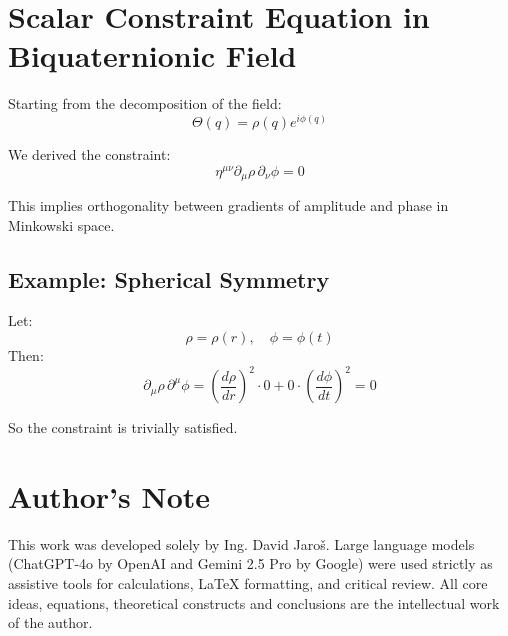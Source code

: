 \documentclass{article}
\begin{document}
\section*{Scalar Constraint Equation in Biquaternionic Field}

Starting from the decomposition of the field:
\[
\Theta(q) = \rho(q) e^{i\phi(q)}
\]

We derived the constraint:
\[
\eta^{\mu\nu} \partial_\mu \rho \, \partial_\nu \phi = 0
\]

This implies orthogonality between gradients of amplitude and phase in Minkowski space.

\subsection*{Example: Spherical Symmetry}

Let:
\[
\rho = \rho(r), \quad \phi = \phi(t)
\]
Then:
\[
\partial_\mu \rho \, \partial^\mu \phi = \left(\frac{d\rho}{dr}\right)^2 \cdot 0 + 0 \cdot \left(\frac{d\phi}{dt}\right)^2 = 0
\]

So the constraint is trivially satisfied.


\section*{Author's Note}

This work was developed solely by Ing. David Jaroš.  
Large language models (ChatGPT-4o by OpenAI and Gemini 2.5 Pro by Google) were used strictly as assistive tools for calculations, LaTeX formatting, and critical review.  
All core ideas, equations, theoretical constructs and conclusions are the intellectual work of the author.
\end{document}
